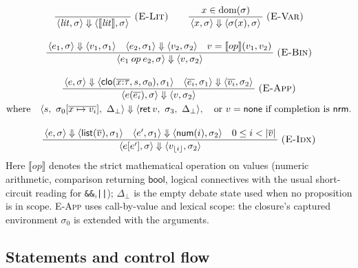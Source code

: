 \documentclass[11pt,a4paper]{article}
\theoremstyle{plain}
\theoremstyle{definition}
\theoremstyle{remark}
\newcommand{\rn}[1]{\textsc{#1}}                          %
\newcommand{\sem}[1]{\ensuremath{\llbracket #1 \rrbracket}} %
\DeclareMathOperator{\dom}{dom}                           %
\newcommand{\evalto}{\Downarrow}
\newcommand{\env}{\sigma}
\newcommand{\nrm}{\mathsf{nrm}}
\newcommand{\ret}{\mathsf{ret}}
\newcommand{\infrule}[3]{%
  \ensuremath{\displaystyle\frac{\,#2\,}{\,#3\,}}\;\rn{(#1)}}
\newcommand{\jspace}{\qquad}
\begin{document}
\begin{gather*}
\infrule{E-Lit}{}{\langle \mathit{lit},\env\rangle\evalto\langle
                  \sem{\mathit{lit}},\env\rangle}\jspace
\infrule{E-Var}{x\in\dom(\env)}{\langle x,\env\rangle\evalto\langle
                  \env(x),\env\rangle}\\[10pt]
\infrule{E-Bin}{\langle e_1,\env\rangle\evalto\langle v_1,\env_1\rangle\quad
                \langle e_2,\env_1\rangle\evalto\langle v_2,\env_2\rangle\quad
                v=\sem{op}(v_1,v_2)}
               {\langle e_1\mathbin{op}e_2,\env\rangle\evalto\langle
                v,\env_2\rangle}\\[10pt]
\infrule{E-App}{\langle e,\env\rangle\evalto\langle
                \mathsf{clo}(\overline{x{:}\tau},s,\env_0),\env_1\rangle\quad
                \langle \overline{e_i},\env_1\rangle\evalto\langle
                \overline{v_i},\env_2\rangle}
               {\langle e(\overline{e_i}),\env\rangle\evalto\langle
                v,\env_2\rangle}\\
\text{where}\quad
\langle s,\ \env_0[\overline{x\mapsto v_i}],\ \Delta_\bot\rangle\evalto
\langle \ret\,v,\ \env_3,\ \Delta_\bot\rangle,\quad
\text{or}\ v=\mathsf{none}\ \text{if completion is }\nrm.\\[10pt]
\infrule{E-Idx}{\langle e,\env\rangle\evalto\langle\mathsf{list}(\overline{v}),
                \env_1\rangle\quad
                \langle e',\env_1\rangle\evalto\langle\mathsf{num}(i),
                \env_2\rangle\quad 0\le i<|\overline{v}|}
               {\langle e[e'],\env\rangle\evalto\langle v_{\lfloor i\rfloor},
                \env_2\rangle}
\end{gather*}
Here $\sem{op}$ denotes the strict mathematical operation on values (numeric
arithmetic, comparison returning $\mathsf{bool}$, logical connectives with the
usual short-circuit reading for \texttt{\&\&},\texttt{||}); $\Delta_\bot$ is the
empty debate state used when no proposition is in scope. \rn{E-App} uses
call-by-value and lexical scope: the closure's captured environment $\env_0$ is
extended with the arguments.

\subsection{Statements and control flow}
\end{document}
